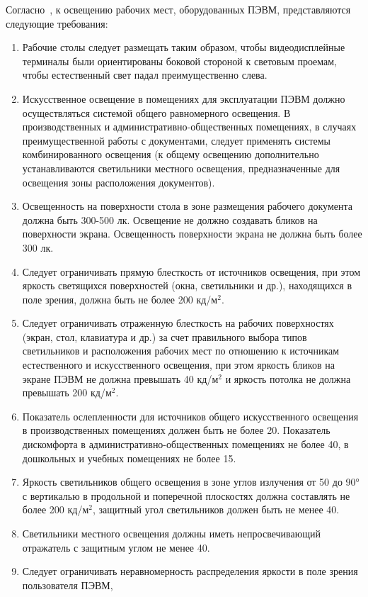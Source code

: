 Согласно~\cite{sanpin_2.4.1340-03}, к освещению рабочих мест, оборудованных ПЭВМ, представляются
следующие требования:
\begin{enumerate}
 \item Рабочие столы следует размещать таким образом, чтобы видеодисплейные 
 терминалы были ориентированы боковой стороной к световым проемам, чтобы естественный свет 
 падал преимущественно слева.
 \item Искусственное освещение в помещениях для эксплуатации ПЭВМ должно осуществляться 
 системой общего равномерного освещения. В производственных и административно-общественных помещениях, 
 в случаях преимущественной работы с документами, следует применять системы комбинированного освещения 
 (к общему освещению дополнительно устанавливаются светильники местного освещения, предназначенные для 
 освещения зоны расположения документов).
 \item Освещенность на поверхности стола в зоне размещения рабочего документа должна быть 300-500 лк. 
 Освещение не должно создавать бликов на поверхности экрана. Освещенность поверхности экрана не должна 
 быть более 300 лк.
 \item Следует ограничивать прямую блесткость от источников освещения, при этом яркость светящихся 
 поверхностей (окна, светильники и др.), находящихся в поле зрения, должна быть не более 200 кд/м$^{2}$.
 \item Следует ограничивать отраженную блесткость на рабочих поверхностях (экран, стол, клавиатура и др.) 
 за счет правильного выбора типов светильников и расположения рабочих мест по отношению к источникам 
 естественного и искусственного освещения, при этом яркость бликов на экране ПЭВМ не должна превышать
 40 кд/м$^{2}$ и яркость потолка не должна превышать 200 кд/м$^{2}$.
 \item Показатель ослепленности для источников общего искусственного освещения в 
 производственных помещениях должен быть не более 20. Показатель дискомфорта в административно-общественных 
 помещениях не более 40, в дошкольных и учебных помещениях не более 15.
 \item Яркость светильников общего освещения в зоне углов излучения от 50 до 90° с вертикалью в 
 продольной и поперечной плоскостях должна составлять не более 200 кд/м$^{2}$, 
 защитный угол светильников должен быть не менее 40\textdegree{}.
 \item Светильники местного освещения должны иметь непросвечивающий отражатель с защитным углом не менее 40\textdegree{}.
 \item Следует ограничивать неравномерность распределения яркости в поле зрения пользователя ПЭВМ, 

\end{enumerate}
